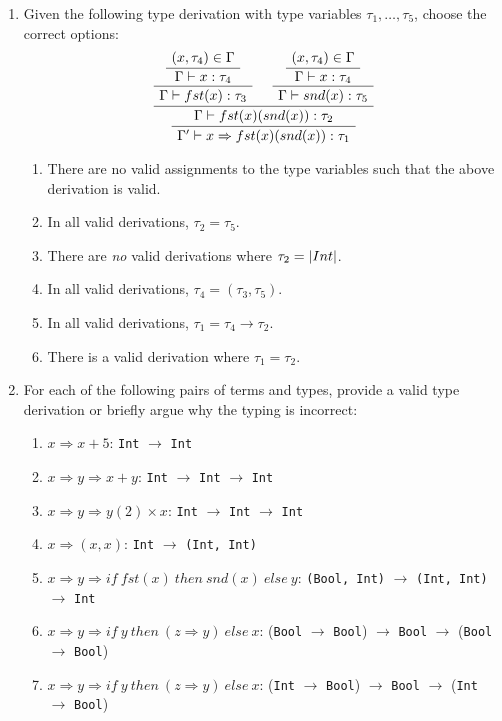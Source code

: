\begin{exercise}{}
  \pagebreak

  \begin{enumerate}
    \item Given the following type derivation with type variables \(\tau_1,
    \ldots, \tau_5\), choose the correct options:
    \begin{equation*}
      \AxiomC{\((x, \tau_4) \in \Gamma\)}
      \UnaryInfC{\(\Gamma \vdash x: \tau_4\)}
      \UnaryInfC{\(\Gamma \vdash fst(x): \tau_3\)}
      \AxiomC{\((x, \tau_4) \in \Gamma\)}
      \UnaryInfC{\(\Gamma \vdash x: \tau_4\)}
      \UnaryInfC{\(\Gamma \vdash snd(x): \tau_5\)}
      \BinaryInfC{\(\Gamma \vdash fst(x)(snd(x)) : \tau_2\)}
      \UnaryInfC{\(\Gamma' \vdash x \Rightarrow fst(x)(snd(x)): \tau_1\)}
      \DisplayProof
    \end{equation*}

    \begin{enumerate}
      \item There are no valid assignments to the type variables such that the
      above derivation is valid.
      \item In all valid derivations, \(\tau_2 = \tau_5\).
      \item There are \emph{no} valid derivations where \(\tau_2 = \lstinline|Int|\).
      \item In all valid derivations, \(\tau_4 = (\tau_3, \tau_5)\).
      \item In all valid derivations, \(\tau_1 = \tau_4 \to \tau_2\).
      \item There is a valid derivation where \(\tau_1 = \tau_2\).
    \end{enumerate}
    \item For each of the following pairs of terms and types, provide a valid
    type derivation or briefly argue why the typing is incorrect:
    \begin{enumerate}
      \item \(x \Rightarrow x + 5\): \lstinline|Int| \(\to\) \lstinline|Int|
      \item \(x \Rightarrow y \Rightarrow x + y\): \lstinline|Int| \(\to\)
      \lstinline|Int| \(\to\) \lstinline|Int|
      \item \(x \Rightarrow y \Rightarrow y(2) \times x\): \lstinline|Int| \(\to\)
      \lstinline|Int| \(\to\) \lstinline|Int|
      \item \(x \Rightarrow (x, x)\): \lstinline|Int| \(\to\) \lstinline|(Int, Int)|
      \item \(x \Rightarrow y \Rightarrow if ~fst(x) ~then ~snd(x) ~else~ y\): \lstinline|(Bool, Int)| \(\to\) \lstinline|(Int, Int)| \(\to\) \lstinline|Int|
      \item \(x \Rightarrow y \Rightarrow if ~y~ then~ (z \Rightarrow y) ~else~ x \): (\lstinline|Bool| \(\to\) \lstinline|Bool|) \(\to\) \lstinline|Bool| \(\to\) (\lstinline|Bool| \(\to\) \lstinline|Bool|)
      \item \(x \Rightarrow y \Rightarrow if ~y~ then~ (z \Rightarrow y) ~else~ x \): (\lstinline|Int| \(\to\) \lstinline|Bool|) \(\to\) \lstinline|Bool| \(\to\) (\lstinline|Int| \(\to\) \lstinline|Bool|)
    \end{enumerate}


\end{enumerate}
\end{exercise}

